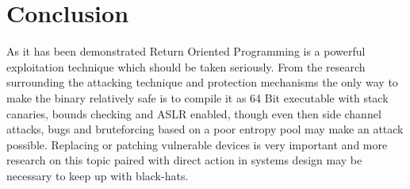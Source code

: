 \documentclass[journal=tosc,submission, notanonymous]{iacrtrans}
\begin{document}
\section{Conclusion}
As it has been demonstrated Return Oriented Programming is a powerful exploitation technique which should be taken seriously. From the research surrounding the attacking technique and protection mechanisms the only way to make the binary relatively safe is to compile it as 64 Bit executable with stack canaries, bounds checking and ASLR enabled, though even then side channel attacks, bugs and bruteforcing based on a poor entropy pool may make an attack possible. Replacing or patching vulnerable devices is very important and more research on this topic paired with direct action in systems design may be necessary to keep up with black-hats.


\end{document}
